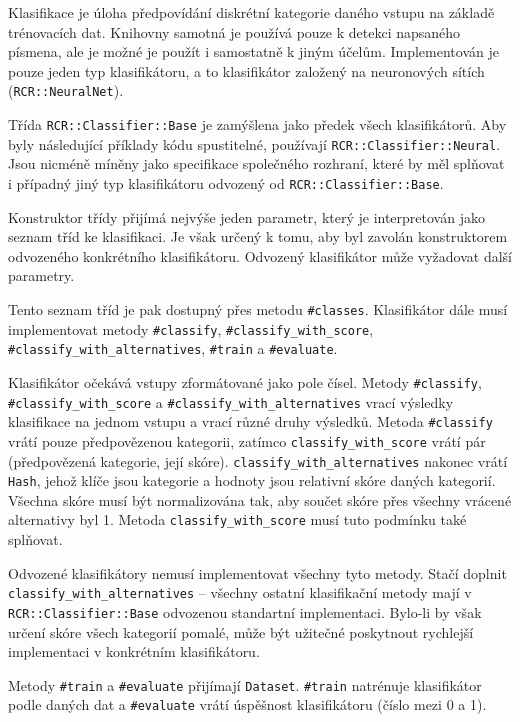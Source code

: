 \documentclass[a4paper]{article}
\begin{document}
Klasifikace je úloha předpovídání diskrétní kategorie daného vstupu na základě
trénovacích dat. Knihovny samotná je používá pouze k detekci napsaného písmena,
ale je možné je použít i samostatně k jiným účelům. Implementován je pouze jeden
typ klasifikátoru, a to klasifikátor založený na neuronových sítích
(\texttt{RCR::NeuralNet}).

Třída \texttt{RCR::Classifier::Base} je zamýšlena jako předek všech
klasifikátorů. Aby byly následující příklady
kódu spustitelné, používají \texttt{RCR::Classifier::Neural}. Jsou nicméně
míněny jako specifikace společného rozhraní, které by měl splňovat i případný
jiný typ klasifikátoru odvozený od \texttt{RCR::Classifier::Base}.

Konstruktor třídy přijímá nejvýše jeden parametr, který je
interpretován jako seznam tříd ke klasifikaci. Je však určený k tomu,
aby byl zavolán konstruktorem odvozeného konkrétního klasifikátoru.
Odvozený klasifikátor může vyžadovat další parametry.

Tento seznam tříd je pak dostupný přes metodu \texttt{\#classes}.
Klasifikátor dále musí implementovat metody \texttt{\#classify},
\texttt{\#classify\_with\_score}, \texttt{\#classify\_with\_alternatives},
\texttt{\#train} a \texttt{\#evaluate}.

Klasifikátor očekává vstupy zformátované jako pole čísel.
Metody \texttt{\#classify}, \texttt{\#classify\_with\_score} a
\texttt{\#classify\_with\_alternatives} vrací výsledky klasifikace
na jednom vstupu a vrací různé druhy výsledků. Metoda \texttt{\#classify}
vrátí pouze předpovězenou kategorii, zatímco \texttt{classify\_with\_score}
vrátí pár (předpovězená kategorie, její skóre).
\texttt{classify\_with\_alternatives} nakonec vrátí \texttt{Hash}, jehož
klíče jsou kategorie a hodnoty jsou relativní skóre daných kategorií.
Všechna skóre musí být normalizována tak, aby součet skóre přes všechny
vrácené alternativy byl 1. Metoda \texttt{classify\_with\_score} musí
tuto podmínku také splňovat.

Odvozené klasifikátory nemusí implementovat všechny tyto metody.
Stačí doplnit \texttt{classify\_with\_alternatives} -- všechny ostatní
klasifikační metody mají v \texttt{RCR::Classifier::Base} odvozenou
standartní implementaci. Bylo-li by však určení skóre všech kategorií
pomalé, může být užitečné poskytnout rychlejší implementaci v konkrétním
klasifikátoru.

Metody \texttt{\#train} a \texttt{\#evaluate} přijímají \texttt{Dataset}.
\texttt{\#train} natrénuje klasifikátor podle daných dat a \texttt{\#evaluate}
vrátí úspěšnost klasifikátoru (číslo mezi 0 a 1).
\end{document}
